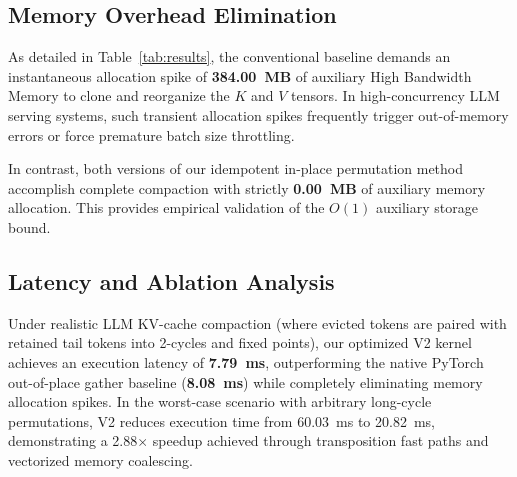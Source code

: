 \documentclass[journal,10pt,twocolumn]{article}
\begin{document}
\begin{table}[t]
\centering
\caption{Empirical Hardware Compaction Performance Comparison on NVIDIA Ada Lovelace Architecture (\texttt{sm\_89})}
\label{tab:results}
\end{table}

\subsection{Memory Overhead Elimination}
As detailed in Table~\ref{tab:results}, the conventional baseline demands an instantaneous allocation spike of \textbf{384.00~MB} of auxiliary High Bandwidth Memory to clone and reorganize the $K$ and $V$ tensors. In high-concurrency LLM serving systems, such transient allocation spikes frequently trigger out-of-memory errors or force premature batch size throttling.

In contrast, both versions of our idempotent in-place permutation method accomplish complete compaction with strictly \textbf{0.00~MB} of auxiliary memory allocation. This provides empirical validation of the $O(1)$ auxiliary storage bound.

\subsection{Latency and Ablation Analysis}
Under realistic LLM KV-cache compaction (where evicted tokens are paired with retained tail tokens into 2-cycles and fixed points), our optimized V2 kernel achieves an execution latency of \textbf{7.79~ms}, outperforming the native PyTorch out-of-place gather baseline (\textbf{8.08~ms}) while completely eliminating memory allocation spikes. In the worst-case scenario with arbitrary long-cycle permutations, V2 reduces execution time from 60.03~ms to 20.82~ms, demonstrating a 2.88$\times$ speedup achieved through transposition fast paths and vectorized memory coalescing.
\end{document}
